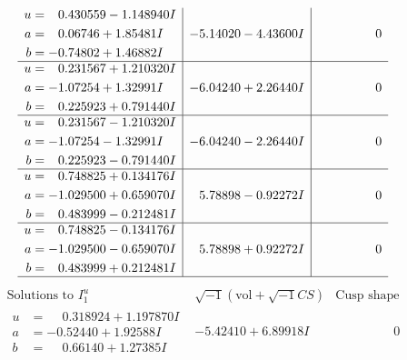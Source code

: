 \documentclass[1p]{elsarticle_modified}
\theoremstyle{definition}
\newcommand{\I}{\sqrt{-1}}
\begin{document}
$$\begin{array}{c|c|c}
\begin{aligned}
u &= \phantom{-}0.430559 - 1.148940 I \\
a &= \phantom{-}0.06746 + 1.85481 I \\
b &= -0.74802 + 1.46882 I\end{aligned}
 & -5.14020 - 4.43600 I & \phantom{-0.000000 } 0 \\ \hline\begin{aligned}
u &= \phantom{-}0.231567 + 1.210320 I \\
a &= -1.07254 + 1.32991 I \\
b &= \phantom{-}0.225923 + 0.791440 I\end{aligned}
 & -6.04240 + 2.26440 I & \phantom{-0.000000 } 0 \\ \hline\begin{aligned}
u &= \phantom{-}0.231567 - 1.210320 I \\
a &= -1.07254 - 1.32991 I \\
b &= \phantom{-}0.225923 - 0.791440 I\end{aligned}
 & -6.04240 - 2.26440 I & \phantom{-0.000000 } 0 \\ \hline\begin{aligned}
u &= \phantom{-}0.748825 + 0.134176 I \\
a &= -1.029500 + 0.659070 I \\
b &= \phantom{-}0.483999 - 0.212481 I\end{aligned}
 & \phantom{-}5.78898 - 0.92272 I & \phantom{-0.000000 } 0 \\ \hline\begin{aligned}
u &= \phantom{-}0.748825 - 0.134176 I \\
a &= -1.029500 - 0.659070 I \\
b &= \phantom{-}0.483999 + 0.212481 I\end{aligned}
 & \phantom{-}5.78898 + 0.92272 I & \phantom{-0.000000 } 0\\
 \hline 
 \end{array}$$\newpage$$\begin{array}{c|c|c}  
\text{Solutions to }I^u_{1}& \I (\text{vol} + \sqrt{-1}CS) & \text{Cusp shape}\\
 \hline 
\begin{aligned}
u &= \phantom{-}0.318924 + 1.197870 I \\
a &= -0.52440 + 1.92588 I \\
b &= \phantom{-}0.66140 + 1.27385 I\end{aligned}
 & -5.42410 + 6.89918 I & \phantom{-0.000000 } 0 \\ \hline\begin{aligned}

\end{aligned}
\end{array}$$
\end{document}
